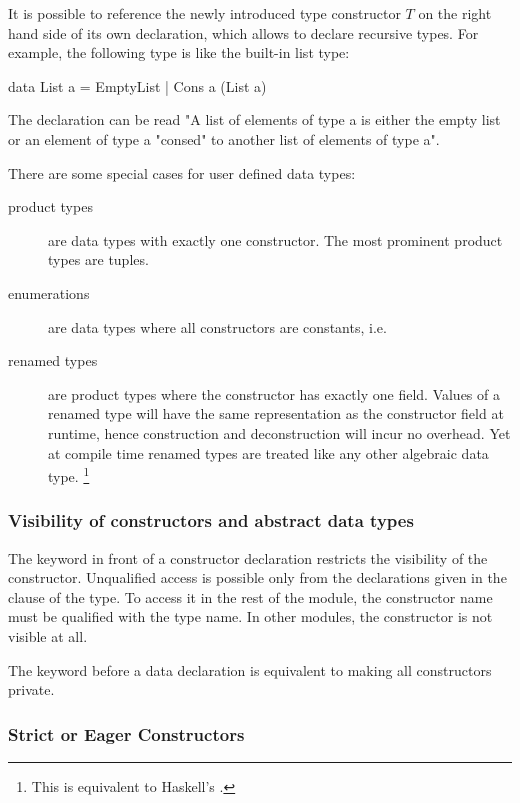 It is possible to reference the newly introduced type constructor $T$ on the right hand side of its own declaration, which allows to declare recursive types. For example, the following type is like the built-in list type:

\begin{code}
data List a = EmptyList | Cons a (List a)
\end{code}

The declaration can be read "A list of elements of type a is either the empty list or an element of type a "consed" to another list of elements of type a".

There are some special cases for user defined data types:
\begin{description}
\item [product types] are data types with exactly one constructor. The most prominent product types are tuples.
\item [enumerations] are data types where all constructors are constants, i.e. 
\item [renamed types] \label{renamed-types} are product types where the constructor has exactly one field. Values of a renamed type will have the same representation as the constructor field at runtime, hence construction and deconstruction will incur no overhead. Yet at compile time renamed types are treated like any other algebraic data type.
\footnote{This is equivalent to Haskell's .}
\end{description}

\subsubsection{Visibility of constructors and abstract data types}

The keyword  in front of a constructor declaration restricts the visibility of the constructor. Unqualified access is possible only from the declarations given in the  clause of the type. To access it in the rest of the module, the constructor name must be qualified with the type name. In other modules, the constructor is not visible at all.

The keyword  before a data declaration is equivalent to making all constructors private.

\subsubsection{Strict or Eager Constructors}

